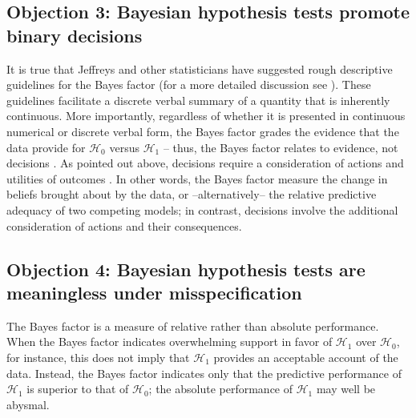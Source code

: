 \subsection{Objection 3: Bayesian hypothesis tests promote binary decisions}
It is true that Jeffreys and other statisticians have suggested rough descriptive guidelines for the Bayes factor (for a more detailed discussion see ). These guidelines facilitate a discrete verbal summary of a quantity that is inherently continuous. More importantly, regardless of whether it is presented in continuous numerical or discrete verbal form, the Bayes factor grades the evidence that the data provide for $\mathcal{H}_0$ versus $\mathcal{H}_1$ -- thus, the Bayes factor relates to evidence, not decisions \cite{LyEtAl2016Rejoinder}. As pointed out above, decisions require a consideration of actions and utilities of outcomes \cite{Lindley1985}. In other words, the Bayes factor measure the change in beliefs brought about by the data, or --alternatively-- the relative predictive adequacy of two competing models; in contrast, decisions involve the additional consideration of actions and their consequences.

\subsection{Objection 4: Bayesian hypothesis tests are meaningless under misspecification}
The Bayes factor is a measure of relative rather than absolute performance. When the Bayes factor indicates overwhelming support in favor of $\mathcal{H}_1$ over $\mathcal{H}_0$, for instance, this does not imply that $\mathcal{H}_1$ provides an acceptable account of the data. Instead, the Bayes factor indicates only that the predictive performance of $\mathcal{H}_1$ is superior to that of $\mathcal{H}_0$; the absolute performance of $\mathcal{H}_1$ may well be abysmal.

